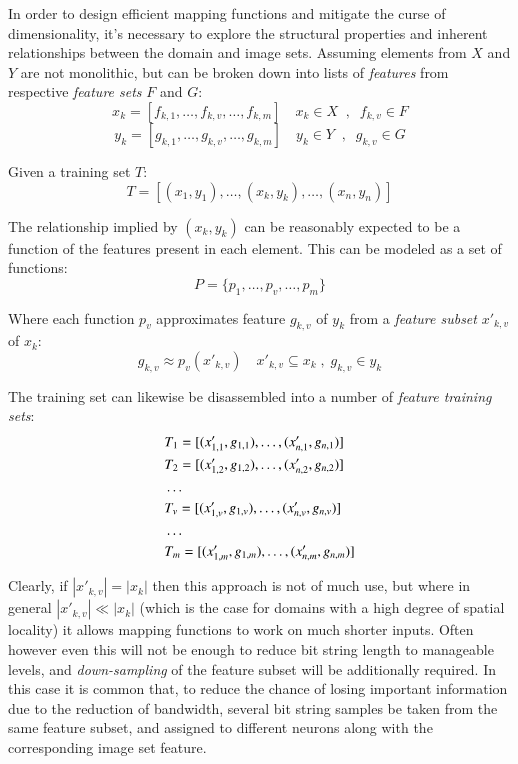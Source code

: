 \documentclass[twocolumn, 9pt]{jsproceedings}
\begin{document}
In order to design efficient mapping functions and mitigate the curse of dimensionality, it's necessary to explore the structural properties and inherent relationships between the domain and image sets. Assuming elements from \(X\) and \(Y\) are not monolithic, but can be broken down into lists of {\it features} from respective {\it feature sets} \(F\) and \(G\):
\begin{equation}
x_k = [ f_{k,1} , \dotsc , f_{k,v} , \dotsc , f_{k,m} ] \quad x_k \in X \;\; , \;\; f_{k,v} \in F
\end{equation}
\begin{equation}
y_k = [ g_{k,1} , \dotsc , g_{k,v} , \dotsc , g_{k,m} ] \quad y_k \in Y \;\; , \;\; g_{k,v} \in G
\end{equation}

Given a training set \(T\):
\begin{equation}
T = [ (x_1 , y_1), \dotsc, (x_k , y_k), \dotsc, (x_n , y_n) ]
\end{equation}

The relationship implied by \((x_k , y_k)\) can be reasonably expected to be a function of the features present in each element. This can be modeled as a set of functions:
\begin{equation}
P = \{ p_1 , \dotsc , p_v , \dotsc , p_m \}
\end{equation}

Where each function \(p_v\) approximates feature \(g_{k,v}\) of \(y_k\) from a {\it feature subset} \(x'_{k,v}\) of \(x_k\):
\begin{equation}
g_{k,v} \approx p_v(x'_{k,v}) \quad x'_{k,v} \subseteq x_k \; , \; g_{k,v} \in y_k
\end{equation}

The training set can likewise be disassembled into a number of {\it feature training sets}:
\begin{align}
& T_1 = [ (x'_{1,1} , g_{1,1}), \dotsc, (x'_{n,1} , g_{n,1}) ] \\
& T_2 = [ (x'_{1,2} , g_{1,2}), \dotsc, (x'_{n,2} , g_{n,2}) ] \notag\\
& \dots \notag\\
& T_v = [ (x'_{1,v} , g_{1,v}), \dotsc, (x'_{n,v} , g_{n,v}) ] \notag\\
& \dots \notag\\
& T_m = [ (x'_{1,m} , g_{1,m}), \dotsc, (x'_{n,m} , g_{n,m}) ] \notag
\end{align}

Clearly, if \(|x'_{k,v}| = |x_k|\) then this approach is not of much use, but where in general \(|x'_{k,v}| \ll |x_k|\) (which is the case for domains with a high degree of spatial locality) it allows mapping functions to work on much shorter inputs. Often however even this will not be enough to reduce bit string length to manageable levels, and {\it down-sampling} of the feature subset will be additionally required. In this case it is common that, to reduce the chance of losing important information due to the reduction of bandwidth, several bit string samples be taken from the same feature subset, and assigned to different neurons along with the corresponding image set feature.
\end{document}
